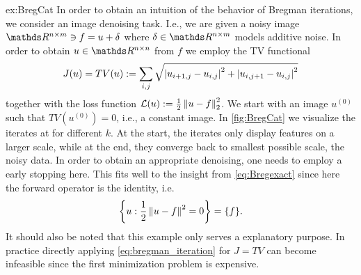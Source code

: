 \begin{example}{}{ex:BregCat}
In order to obtain an intuition of the behavior of Bregman iterations, we consider an image denoising task. I.e., we are given a noisy image $\R^{n\times m}\ni f = u + \delta$ where $\delta\in\R^{n\times m}$ models additive noise. In order to obtain $u\in\R^{n\times n}$ from $f$ we employ the TV functional \cite{rudin1992nonlinear} 
%
\begin{align*}
J(u) = TV(u) := \sum_{i,j} \sqrt{\left|u_{i+1, j} - u_{i,j}\right|^2 + \left|u_{i,j+1} - u_{i,j}\right|^2}
\end{align*}
%
together with the loss function $\mathcal{L}(u):= \frac{1}{2}\left\|u-f\right\|^2_2$.
%
We start with an image $u^{(0)}$ such that $TV(u^{(0)})=0$, i.e., a constant image. In \cref{fig:BregCat} we visualize the iterates at for different $k$. At the start, the iterates only display features on a larger scale, while at the end, they converge back to smallest possible scale, the noisy data. In order to obtain an appropriate denoising, one needs to employ a early stopping here. This fits well to the insight from \cref{eq:Bregexact} since here the forward operator is the identity, i.e.
%
\begin{align*}
\left\{ u: \frac{1}{2}\left\|u-f\right\|^2=0\right\} = \{f\}. 
\end{align*}
%
It should also be noted that this example only serves a explanatory purpose. In practice directly applying \cref{eq:bregman_iteration} for $J=TV$ can become infeasible since the first minimization problem is expensive.
\end{example}%
%
%
%
%
